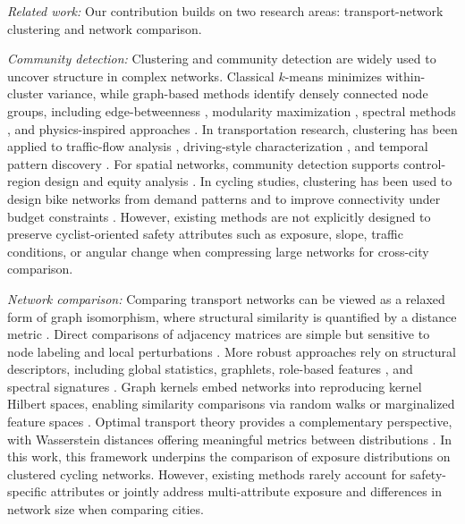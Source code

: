 \documentclass[lettersize,journal]{IEEEtran}
\begin{document}
\textit{Related work:} Our contribution builds on two research areas: transport-network clustering and network comparison.

\textit{Community detection:} Clustering and community detection are widely used to uncover structure in complex networks. Classical $k$-means \cite{hartigan1979algorithm} minimizes within-cluster variance, while graph-based methods identify densely connected node groups, including edge-betweenness \cite{girvan2002community}, modularity maximization \cite{clauset2004finding}, spectral methods \cite{newman2006finding}, and physics-inspired approaches \cite{wu2004finding}. In transportation research, clustering has been applied to traffic-flow analysis \cite{xia2007defining, gu2016unsupervised}, driving-style characterization \cite{gace2021driving}, and temporal pattern discovery \cite{weijermars2005analyzing}. For spatial networks, community detection supports control-region design and equity analysis \cite{haghbayan2021community}. In cycling studies, clustering has been used to design bike networks from demand patterns \cite{akbarzadeh2018designing} and to improve connectivity under budget constraints \cite{natera2020data}. However, existing methods are not explicitly designed to preserve cyclist-oriented safety attributes such as exposure, slope, traffic conditions, or angular change when compressing large networks for cross-city comparison.

\textit{Network comparison:} Comparing transport networks can be viewed as a relaxed form of graph isomorphism, where structural similarity is quantified by a distance metric \cite{chartrand2013first}. Direct comparisons of adjacency matrices are simple but sensitive to node labeling and local perturbations \cite{hand2007principles}. More robust approaches rely on structural descriptors, including global statistics, graphlets, role-based features \cite{yaverouglu2014revealing,faisal2017grafene}, and spectral signatures \cite{wilson2008study}. Graph kernels embed networks into reproducing kernel Hilbert spaces, enabling similarity comparisons via random walks or marginalized feature spaces \cite{gartner2003graph,kashima2003marginalized,vishwanathan2010graph}.  Optimal transport theory provides a complementary perspective, with Wasserstein distances offering meaningful metrics between distributions \cite{villani2008optimal,villani2021topics,santambrogio2015optimal}. In this work, this framework underpins the comparison of exposure distributions on clustered cycling networks. However, existing methods rarely account for safety-specific attributes or jointly address multi-attribute exposure and differences in network size when comparing cities.
\end{document}
